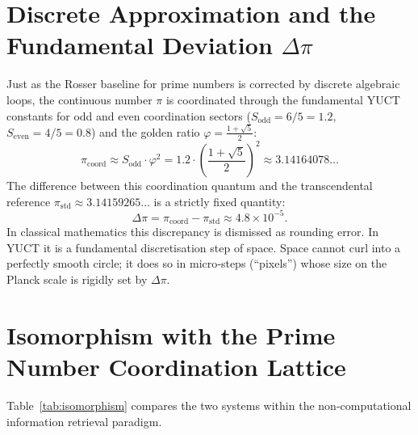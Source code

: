 \documentclass[12pt,a4paper]{article}
\newcommand{\Sodd}{S_{\mathrm{odd}}}
\newcommand{\Seven}{S_{\mathrm{even}}}
\begin{document}
	\section{Discrete Approximation and the Fundamental Deviation $\Delta\pi$}
	\label{sec:delta-pi}
	Just as the Rosser baseline for prime numbers is corrected by discrete algebraic loops, the continuous number $\pi$ is coordinated through the fundamental YUCT constants for odd and even coordination sectors ($\Sodd = 6/5 = 1.2$, $\Seven = 4/5 = 0.8$) and the golden ratio $\varphi = \frac{1+\sqrt{5}}{2}$:
	\begin{equation}
		\pi_{\mathrm{coord}} \approx \Sodd \cdot \varphi^2 = 1.2 \cdot \left(\frac{1+\sqrt{5}}{2}\right)^2 \approx 3.14164078\ldots
		\label{eq:pi-approx}
	\end{equation}
	The difference between this coordination quantum and the transcendental reference $\pi_{\mathrm{std}} \approx 3.14159265\ldots$ is a strictly fixed quantity:
	\begin{equation}
		\Delta\pi = \pi_{\mathrm{coord}} - \pi_{\mathrm{std}} \approx 4.8 \times 10^{-5}.
		\label{eq:delta-pi-val}
	\end{equation}
	In classical mathematics this discrepancy is dismissed as rounding error. In YUCT it is a fundamental discretisation step of space. Space cannot curl into a perfectly smooth circle; it does so in micro‑steps (“pixels”) whose size on the Planck scale is rigidly set by $\Delta\pi$.
	
	\section{Isomorphism with the Prime Number Coordination Lattice}
	\label{sec:isomorphism}
	Table~\ref{tab:isomorphism} compares the two systems within the non‑computational information retrieval paradigm.
	
\end{document}
